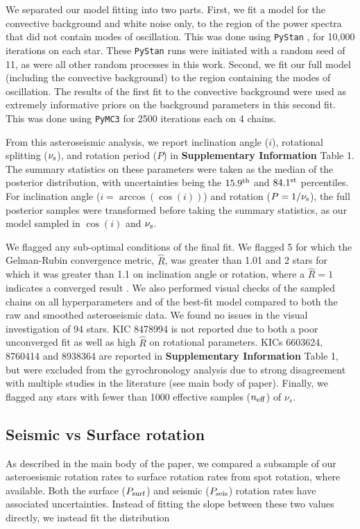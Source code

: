 We separated our model fitting into two parts. First, we fit a model for the convective background and white noise only, to the region of the power spectra that did not contain modes of oscillation. This was done using \texttt{PyStan} \cite{vanhoey+2013, m_carpenter+2017}, for 10,000 iterations on each star. These \texttt{PyStan} runs were initiated with a random seed of 11, as were all other random processes in this work. Second, we fit our full model (including the convective background) to the region containing the modes of oscillation. The results of the first fit to the convective background were used as extremely informative priors on the background parameters in this second fit. This was done using \texttt{PyMC3} \cite{vanderwalt+2011,m_salvatier+2016, m_thetheanodevelopmentteam+2016} for 2500 iterations each on 4 chains.

From this asteroseismic analysis, we report inclination angle ($i$), rotational splitting ($\nu_{\rm s}$), and rotation period ($P$) in \textbf{Supplementary Information} Table 1. The summary statistics on these parameters were taken as the median of the posterior distribution, with uncertainties being the $15.9^{\rm th}$ and $84.1^{\rm st}$ percentiles. For inclination angle ($i = \arccos(\cos(i))$) and rotation ($P = 1/\nu_{\rm s}$), the full posterior samples were transformed before taking the summary statistics, as our model sampled in $\cos(i)$ and $\nu_{\rm s}$.

We flagged any sub-optimal conditions of the final fit. We flagged 5 for which the Gelman-Rubin convergence metric, $\hat{R}$, was greater than 1.01 and 2 stars for which it was greater than 1.1 on inclination angle or rotation, where a $\hat{R} = 1$ indicates a converged result \cite{gelman+rubin1992}. We also performed visual checks of the sampled chains on all hyperparameters and of the best-fit model compared to both the raw and smoothed asteroseismic data. We found no issues in the visual investigation of 94 stars. KIC 8478994 is not reported due to both a poor unconverged fit as well as high $\hat{R}$ on rotational parameters. KICs 6603624, 8760414 and 8938364 are reported in  \textbf{Supplementary Information} Table 1, but were excluded from the gyrochronology analysis due to strong disagreement with multiple studies in the literature (see main body of paper). Finally, we flagged any stars with fewer than 1000 effective samples ($n_{\rm eff}$) of $\nu_s$.

\subsection{Seismic vs Surface rotation}
As described in the main body of the paper, we compared a subsample of our asteroesismic rotation rates to surface rotation rates from spot rotation, where available. Both the surface ($P_{\rm surf}$) and seismic ($P_{\rm seis}$) rotation rates have associated uncertainties. Instead of fitting the slope between these two values directly, we instead fit the distribution

